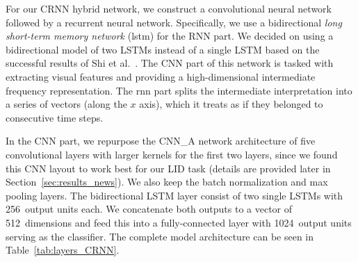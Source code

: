 For our CRNN hybrid network, we construct a convolutional neural network followed by a recurrent neural network. Specifically, we use a bidirectional \emph{long short-term memory network} (\ac{lstm}) for the RNN part. We decided on using a bidirectional model of two LSTMs instead of a single LSTM based on the successful results of Shi et al.~\cite{shi2016end}. The CNN part of this network is tasked with extracting visual features and providing a high-dimensional intermediate frequency representation. The \ac{rnn} part splits the intermediate interpretation into a series of vectors (along the $x$ axis), which it treats as if they belonged to consecutive time steps.

In the CNN part, we repurpose the CNN\_A network architecture of five convolutional layers with larger kernels for the first two layers, since we found this CNN layout to work best for our LID task (details are provided later in Section~\ref{sec:results_news}). We also keep the batch normalization and max pooling layers. The bidirectional LSTM layer consist of two single LSTMs with \num{256}~output units each. We concatenate both outputs to a vector of \num{512}~dimensions and feed this into a fully-connected layer with \num{1024}~output units serving as the classifier. The complete model architecture can be seen in Table~\ref{tab:layers_CRNN}.
%

